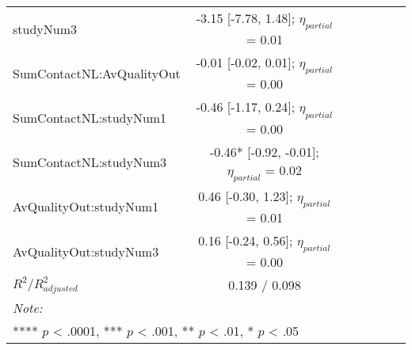 \begin{landscape}
\begin{table}
\begin{minipage}[t][\textheight][t]{\textwidth}
{\begin{tabular}[t]{lcccccc}
studyNum3 & -3.15 [-7.78,  1.48]; $\eta_{partial}$ = 0.01 &  &  &  &  & \\
SumContactNL:AvQualityOut & -0.01 [-0.02,  0.01]; $\eta_{partial}$ = 0.00 &  &  &  &  & \\
SumContactNL:studyNum1 & -0.46 [-1.17,  0.24]; $\eta_{partial}$ = 0.00 &  &  &  &  & \\
SumContactNL:studyNum3 & -0.46* [-0.92, -0.01]; $\eta_{partial}$ = 0.02 &  &  &  &  & \\
AvQualityOut:studyNum1 & 0.46 [-0.30,  1.23]; $\eta_{partial}$ = 0.01 &  &  &  &  & \\
AvQualityOut:studyNum3 & 0.16 [-0.24,  0.56]; $\eta_{partial}$ = 0.00 &  &  &  &  & \\
$R^2 / R^2_{adjusted}$ & 0.139 / 0.098 &  &  &  &  & \\
\bottomrule
\multicolumn{7}{l}{\rule{0pt}{1em}\textit{Note: }}\\
\multicolumn{7}{l}{\rule{0pt}{1em}**** $p$ < .0001, *** $p$ < .001, ** $p$ < .01, * $p$ < .05}\\
\end{tabular}}
\end{minipage}
\end{table}
\end{landscape}
